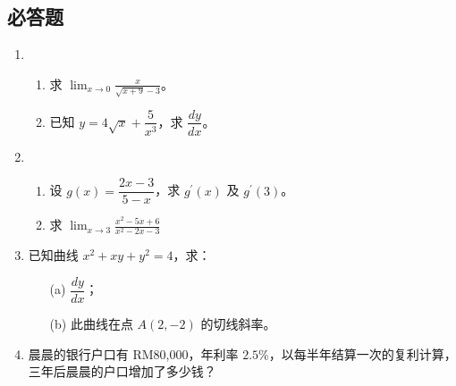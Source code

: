 \documentclass{article}
\begin{document}
\newpage
\subsection*{必答题}
\begin{enumerate}
    \item \begin{enumerate}
        \item 求 $\displaystyle\lim_{x \rightarrow 0} \frac{x}{\sqrt{x+9}-3}$。
    
        \item 已知 $y=4 \sqrt{x}+\dfrac{5}{x^3}$，求 $\dfrac{d y}{d x}$。
    \end{enumerate}
    
    \item \begin{enumerate}
        \item 设 $g(x)=\dfrac{2 x-3}{5-x}$，求 $g^{\prime}(x)$ 及 $g^{\prime}(3)$。
    
        \item 求 $\displaystyle\lim _{x \rightarrow 3} \frac{x^2-5 x+6}{x^2-2 x-3}$
    \end{enumerate}
    
    \item 已知曲线 $x^2+x y+y^2=4$，求：
    \begin{enumerate}
        \item[(a)] $\dfrac{d y}{d x}$；
        \item[(b)] 此曲线在点 $A(2,-2)$ 的切线斜率。
    \end{enumerate}
    
    \item 晨晨的银行户口有 RM80,000，年利率 $2.5\%$，以每半年结算一次的复利计算，三年后晨晨的户口增加了多少钱？
\end{enumerate}
\end{document}
